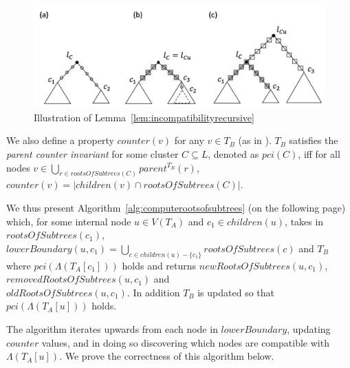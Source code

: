 \documentclass{article}
\newcommand{\leafset}{\Lambda}
\begin{document}
    \begin{figure}[h]
        \includegraphics[scale=0.5]{incompatibilityrecursive}
        \centering
        \caption{Illustration of Lemma~\ref{lem:incompatibilityrecursive}}
        \label{fig:incompatibilityrecursive}
    \end{figure}

    We also define a property $counter(v)$ for any $v \in T_B$ (as in \cite{jansson2018algorithms}). $T_B$ satisfies the \textit{parent counter invariant} for some cluster $C \subseteq L$, denoted as $pci(C)$, iff for all nodes $v \in \bigcup_{r \in rootsOfSubtrees(C)} parent^{T_B}(r)$, $counter(v) = |children(v) \cap rootsOfSubtrees(C)|$.

    We thus present Algorithm~\ref{alg:computerootsofsubtrees} (on the following page) which, for some internal node $u \in V(T_A)$ and $c_1 \in children(u)$, takes in $rootsOfSubtrees(c_1)$, $lowerBoundary(u, c_1) = \bigcup_{c \in children(u) - \{c_1\}} rootsOfSubtrees(c)$ and $T_B$ where $pci(\leafset(T_A[c_1]))$ holds and returns $newRootsOfSubtrees(u, c_1)$, $removedRootsOfSubtrees(u, c_1)$ and\\ %
    $oldRootsOfSubtrees(u, c_1)$. In addition $T_B$ is updated so that $pci(\leafset(T_A[u]))$ holds.

    The algorithm iterates upwards from each node in $lowerBoundary$, updating $counter$ values, and in doing so discovering which nodes are compatible with $\leafset(T_A[u])$. We prove the correctness of this algorithm below.
\end{document}
